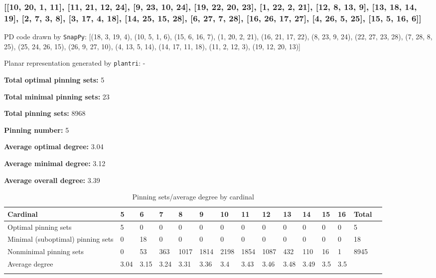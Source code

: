 \documentclass{article}%
\begin{document}
\newpage

\subsubsection{[[10, 20, 1, 11], [11, 21, 12, 24], [9, 23, 10, 24], [19, 22, 20, 23], [1, 22, 2, 21], [12, 8, 13, 9], [13, 18, 14, 19], [2, 7, 3, 8], [3, 17, 4, 18], [14, 25, 15, 28], [6, 27, 7, 28], [16, 26, 17, 27], [4, 26, 5, 25], [15, 5, 16, 6]]}

{\small\noindent PD code drawn by \texttt{SnapPy}: [(18, 3, 19, 4), (10, 5, 1, 6), (15, 6, 16, 7), (1, 20, 2, 21), (16, 21, 17, 22), (8, 23, 9, 24), (22, 27, 23, 28), (7, 28, 8, 25), (25, 24, 26, 15), (26, 9, 27, 10), (4, 13, 5, 14), (14, 17, 11, 18), (11, 2, 12, 3), (19, 12, 20, 13)]}

{\small\noindent Planar representation generated by \texttt{plantri}: -}

\begin{multicols}{2}
{\normalsize \noindent\textbf{Total optimal pinning sets:} 5

\noindent\textbf{Total minimal pinning sets:} 23

\noindent\textbf{Total pinning sets:} 8968

\noindent\textbf{Pinning number:} 5

}
\columnbreak

{\normalsize \noindent\textbf{Average optimal degree:} 3.04

\noindent\textbf{Average minimal degree:} 3.12

\noindent\textbf{Average overall degree:} 3.39

}
\end{multicols}

\begin{table}[ht]
	\caption{Pinning sets/average degree by cardinal}
	\centering
	\renewcommand{\arraystretch}{1.5}
	\begin{tabularx}{\textwidth}{lXXXXXXXXXXXXXX}
		\toprule
			Cardinal & 5 & 6 & 7 & 8 & 9 & 10 & 11 & 12 & 13 & 14 & 15 & 16 & Total\\
			\hline
			Optimal pinning sets & 5 & 0 & 0 & 0 & 0 & 0 & 0 & 0 & 0 & 0 & 0 & 0 & 5 \\
			Minimal (suboptimal) pinning sets & 0 & 18 & 0 & 0 & 0 & 0 & 0 & 0 & 0 & 0 & 0 & 0 & 18 \\
			Nonminimal pinning sets & 0 & 53 & 363 & 1017 & 1814 & 2198 & 1854 & 1087 & 432 & 110 & 16 & 1 & 8945 \\
			Average degree & 3.04 & 3.15 & 3.24 & 3.31 & 3.36 & 3.4 & 3.43 & 3.46 & 3.48 & 3.49 & 3.5 & 3.5 &  \\
		\bottomrule \\ 
	\end{tabularx}
\end{table}
\end{document}
